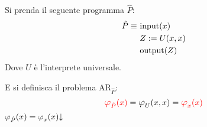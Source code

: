\begin{minipage}{.48\textwidth}
    Si prenda il seguente programma $\hat{P}$:
    \centering
    \begin{align}
    \hat{P} \equiv\ & \text{input($x$)}       \notag\\
    & Z := U(x,x)                             \notag\\
    & \text{output($Z$)}                      \notag
    \end{align}
    Dove $U$ è l'interprete universale.
\end{minipage}
\begin{minipage}{.48\textwidth}\centering
    E si definisca il problema $\text{AR}_{\hat{P}}$:
    $${\color{red}\semRAM_{\hat{P}}(x)}=\semRAM_{U}(x,x)={\color{red}\semRAM_{x}(x)}$$
    {{\color{red}$\semRAM_{\hat{P}}(x)=\semRAM_x(x)\termina$}}
\end{minipage}\vspace{1em}


